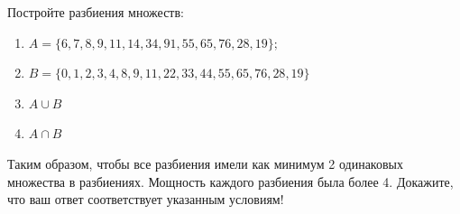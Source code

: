 \question
Постройте разбиения множеств:
\begin{enumerate}
	\renewcommand{\labelenumi}{\alph{enumi})}
	\item $A = \{6, 7, 8, 9, 11, 14, 34, 91, 55, 65, 76, 28, 19\};$
	\item $B = \{0, 1, 2, 3, 4, 8, 9, 11, 22, 33, 44, 55, 65, 76, 28, 19\}$
	\item $A \cup B$
	\item $A \cap B$
\end{enumerate}
Таким образом, чтобы все разбиения имели как минимум 2 одинаковых множества в разбиениях.
Мощность каждого разбиения была более 4.
Докажите, что ваш ответ соответствует указанным условиям!
